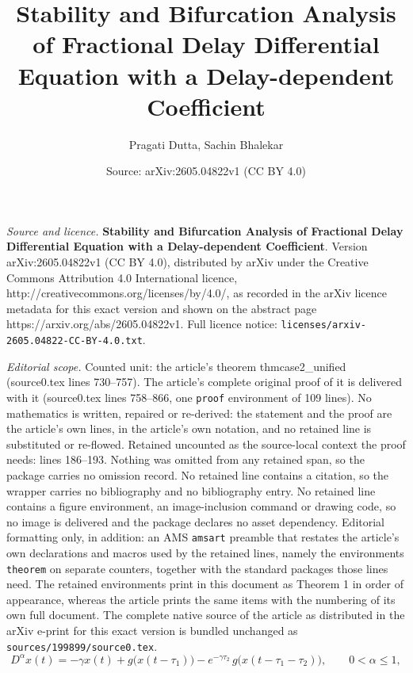 \documentclass[10pt,a4paper]{amsart}
\title{\textbf{Stability and Bifurcation Analysis of Fractional Delay Differential Equation with a Delay-dependent Coefficient}}
\author{Pragati Dutta, Sachin Bhalekar}
\date{Source: arXiv:2605.04822v1 (CC BY 4.0)}
\begin{document}
\maketitle

\noindent\emph{Source and licence.} \textbf{Stability and Bifurcation Analysis of Fractional Delay Differential Equation with a Delay-dependent Coefficient}. Version arXiv:2605.04822v1 (CC BY 4.0), distributed by arXiv under the Creative Commons Attribution 4.0 International licence, http://creativecommons.org/licenses/by/4.0/, as recorded in the arXiv licence metadata for this exact version and shown on the abstract page https://arxiv.org/abs/2605.04822v1. Full licence notice: \texttt{licenses/arxiv-2605.04822-CC-BY-4.0.txt}.\par\smallskip

\noindent\textit{Editorial scope.} Counted unit: the article's theorem thmcase2\_unified (source0.tex lines 730--757). The article's complete original proof of it is delivered with it (source0.tex lines 758--866, one \texttt{proof} environment of 109 lines). No mathematics is written, repaired or re-derived: the statement and the proof are the article's own lines, in the article's own notation, and no retained line is substituted or re-flowed.  Retained uncounted as the source-local context the proof needs: lines 186--193.  Nothing was omitted from any retained span, so the package carries no omission record.  No retained line contains a citation, so the wrapper carries no bibliography and no bibliography entry.  No retained line contains a figure environment, an image-inclusion command or drawing code, so no image is delivered and the package declares no asset dependency.  Editorial formatting only, in addition: an AMS \texttt{amsart} preamble that restates the article's own declarations and macros used by the retained lines, namely the environments \texttt{theorem} on separate counters, together with the standard packages those lines need.  The retained environments print in this document as Theorem 1 in order of appearance, whereas the article prints the same items with the numbering of its own full document.  The complete native source of the article as distributed in the arXiv e-print for this exact version is bundled unchanged as \texttt{sources/199899/source0.tex}.
	\begin{equation}
		D^{\alpha} x(t)
		= -\gamma x(t)
		+ g\big(x(t - \tau_1)\big)
		- e^{-\gamma \tau_2}\, g\big(x(t - \tau_1 - \tau_2)\big),
		\qquad 0 < \alpha \le 1,
		\label{eq:main}
	\end{equation}
\end{document}
